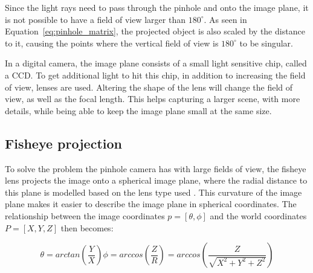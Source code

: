 Since the light rays need to pass through the pinhole and onto the image plane, it is not possible to have a field of view larger than $180^\circ$. As seen in Equation~\eqref{eq:pinhole_matrix}, the projected object is also scaled by the distance to it, causing the points where the vertical field of view is $180^\circ$ to be singular. 

In a digital camera, the image plane consists of a small light sensitive chip, called a CCD. To get additional light to hit this chip, in addition to increasing the field of view, lenses are used. Altering the shape of the lens will change the field of view, as well as the focal length. This helps capturing a larger scene, with more details, while being able to keep the image plane small at the same size. 



\subsection{Fisheye projection}

To solve the problem the pinhole camera has with large fields of view, the fisheye lens projects the image onto a spherical image plane, where the radial distance to this plane is modelled based on the lens type used . This curvature of the image plane makes it easier to describe the image plane in spherical coordinates. The relationship between the image coordinates $p = [\theta,\phi]$ and the world coordinates $P = [X,Y,Z]$ then becomes:

\begin{subequations}
\begin{equation}
   \theta = arctan\left(\frac{Y}{X}\right)
    \label{eq:fisheye_theta}
\end{equation}
\begin{equation}
    \phi = arccos\left(\frac{Z}{R}\right) = arccos\left(\frac{Z}{\sqrt{X^2+Y^2+Z^2}}\right)
    \label{eq:fisheye_phi}
\end{equation}
\label{eq:fisheye}
\end{subequations}

